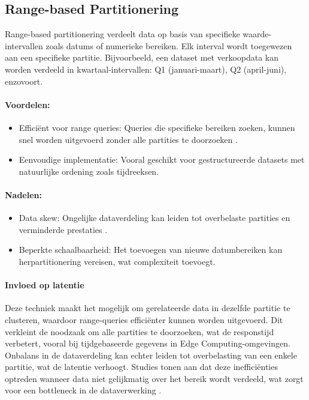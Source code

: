 \subsection{Range-based Partitionering}
Range-based partitionering verdeelt data op basis van specifieke waarde-intervallen zoals datums of numerieke bereiken. Elk interval wordt toegewezen aan een specifieke partitie. Bijvoorbeeld, een dataset met verkoopdata kan worden verdeeld in kwartaal-intervallen: Q1 (januari-maart), Q2 (april-juni), enzovoort.
 
\paragraph{Voordelen:}
\begin{itemize}
    \item Efficiënt voor range queries: Queries die specifieke bereiken zoeken, kunnen snel worden uitgevoerd zonder alle partities te doorzoeken \autocite{Ponnusamy2024,Mahmud2020}.
    \item Eenvoudige implementatie: Vooral geschikt voor gestructureerde datasets met natuurlijke ordening zoals tijdreeksen.
\end{itemize}
 
\paragraph{Nadelen:}
\begin{itemize}
    \item Data skew: Ongelijke dataverdeling kan leiden tot overbelaste partities en verminderde prestaties \autocite{Mahmud2020}.
    \item Beperkte schaalbaarheid: Het toevoegen van nieuwe datumbereiken kan herpartitionering vereisen, wat complexiteit toevoegt.
\end{itemize}
 
\paragraph{Invloed op latentie} 
Deze techniek maakt het mogelijk om gerelateerde data in dezelfde partitie te clusteren, waardoor range-queries efficiënter kunnen worden uitgevoerd. Dit verkleint de noodzaak om alle partities te doorzoeken, wat de responstijd verbetert, vooral bij tijdgebaseerde gegevens in Edge Computing-omgevingen. Onbalans in de dataverdeling kan echter leiden tot overbelasting van een enkele partitie, wat de latentie verhoogt. Studies tonen aan dat deze inefficiënties optreden wanneer data niet gelijkmatig over het bereik wordt verdeeld, wat zorgt voor een bottleneck in de dataverwerking \autocite{Mahmud2020}.
 
